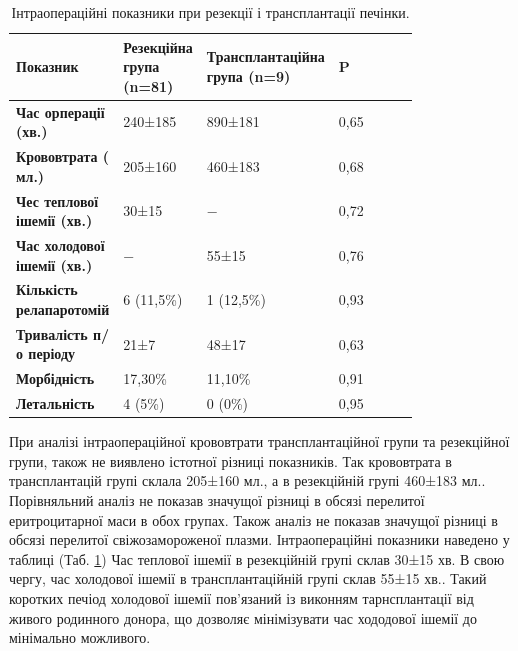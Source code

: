 \begin{table}[]
\centering
\caption{Інтраопераційні показники при резекції і трансплантації печінки.}
\label{tab:operdani}
\begin{tabular}{|p{0.2\linewidth}|
                 p{0.2\linewidth}|
                 p{0.2\linewidth}|
                 p{0.2\linewidth}|}
\hline
{\color[HTML]{231F20} \textbf{Показник}} &
  {\color[HTML]{231F20} \textbf{Резекційна група (n=81)}} &
  {\color[HTML]{231F20} \textbf{Транс\-план\-тацій\-на група (n=9)}} &
  {\color[HTML]{231F20} \textbf{P}} \\ \hline
{\color[HTML]{231F20} \textbf{Час орперації (хв.)}}        & {\color[HTML]{231F20} 240±185} & {\color[HTML]{231F20} 890±181} & {\color[HTML]{231F20} 0,65} \\ \hline
{\color[HTML]{231F20} \textbf{Крововтрата ( мл.)}}         & {\color[HTML]{231F20} 205±160} & {\color[HTML]{231F20} 460±183} & {\color[HTML]{231F20} 0,68} \\ \hline
{\color[HTML]{231F20} \textbf{Чес теплової ішемії (хв.)}}  & {\color[HTML]{231F20} 30±15}   & {\color[HTML]{231F20} −}       & {\color[HTML]{231F20} 0,72} \\ \hline
{\color[HTML]{231F20} \textbf{Час холодової ішемії (хв.)}} & {\color[HTML]{231F20} −}       & {\color[HTML]{231F20} 55±15}   & {\color[HTML]{231F20} 0,76} \\ \hline
{\color[HTML]{231F20} \textbf{Кількість релапаротомій}} &
  {\color[HTML]{231F20} 6 (11,5\%)} &
  {\color[HTML]{231F20} 1 (12,5\%)} &
  {\color[HTML]{231F20} 0,93} \\ \hline
{\color[HTML]{231F20} \textbf{Тривалість п/о періоду}}     & {\color[HTML]{231F20} 21±7}    & {\color[HTML]{231F20} 48±17}   & {\color[HTML]{231F20} 0,63} \\ \hline
{\color[HTML]{231F20} \textbf{Морбідність}}                & {\color[HTML]{231F20} 17,30\%} & {\color[HTML]{231F20} 11,10\%} & {\color[HTML]{231F20} 0,91} \\ \hline
{\color[HTML]{231F20} \textbf{Летальність}}                & {\color[HTML]{231F20} 4 (5\%)} & {\color[HTML]{231F20} 0 (0\%)} & {\color[HTML]{231F20} 0,95} \\ \hline
\end{tabular}
\end{table}

При аналізі інтраопераційної крововтрати трансплантаційної групи та резекційної групи, також не виявлено істотної різниці показників. Так крововтрата в трансплантацій групі склала 205±160 мл., а в резекційній групі 460±183 мл.. Порівняльний аналіз не показав значущої різниці в обсязі перелитої еритроцитарної маси в обох групах. Також аналіз не показав значущої різниці в обсязі перелитої свіжозамороженої плазми.
Інтраопераційні показники наведено у таблиці (Таб. \ref{tab:operdani})
Час теплової ішемії в резекційній групі склав 30±15 хв. В свою чергу, час холодової ішемії в трансплантаційній групі склав 55±15 хв.. Такий коротких печіод холодової ішемії пов'язаний із виконням тарнсплантації від живого родинного донора, що дозволяє мінімізувати час хододової ішемії до мінімально можливого. 

